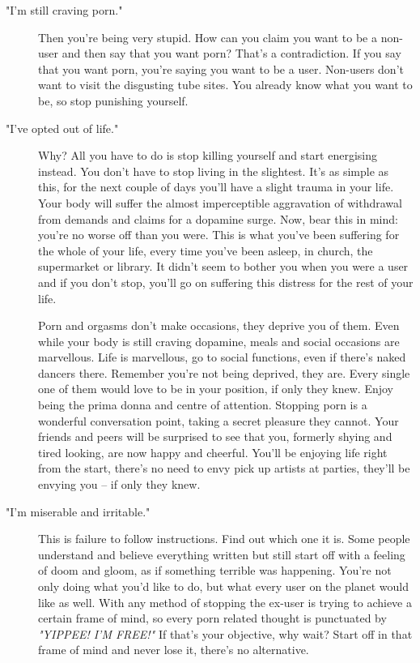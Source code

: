 \documentclass[easypeasy.tex]{subfiles}
\begin{document}
\begin{description}
\begin{description}
      \item ["I'm still craving porn."] Then you're being very stupid. How can you claim you want to be a non-user and then say that you want porn? That's a contradiction. If you say that you want porn, you're saying you want to be a user. Non-users don't want to visit the disgusting tube sites. You already know what you want to be, so stop punishing yourself.

      \item ["I've opted out of life."] Why? All you have to do is stop killing yourself and start energising instead. You don't have to stop living in the slightest. It's as simple as this, for the next couple of days you'll have a slight trauma in your life. Your body will suffer the almost imperceptible aggravation of withdrawal from demands and claims for a dopamine surge. Now, bear this in mind: you're no worse off than you were. This is what you've been suffering for the whole of your life, every time you've been asleep, in church, the supermarket or library. It didn't seem to bother you when you were a user and if you don't stop, you'll go on suffering this distress for the rest of your life.

      Porn and orgasms don't make occasions, they deprive you of them. Even while your body is still craving dopamine, meals and social occasions are marvellous. Life is marvellous, go to social functions, even if there's naked dancers there. Remember you're not being deprived, they are. Every single one of them would love to be in your position, if only they knew. Enjoy being the prima donna and centre of attention. Stopping porn is a wonderful conversation point, taking a secret pleasure they cannot. Your friends and peers will be surprised to see that you, formerly shying and tired looking, are now happy and cheerful. You'll be enjoying life right from the start, there's no need to envy pick up artists at parties, they'll be envying you -- if only they knew.

    \item ["I'm miserable and irritable."] This is failure to follow instructions. Find out which one it is. Some people understand and believe everything written but still start off with a feeling of doom and gloom, as if something terrible was happening. You're not only doing what you'd like to do, but what every user on the planet would like as well. With any method of stopping the ex-user is trying to achieve a certain frame of mind, so every porn related thought is punctuated by \textit{"YIPPEE! I'M FREE!"} If that's your objective, why wait? Start off in that frame of mind and never lose it, there's no alternative.
    

\end{description}
\end{description}
\end{document}
